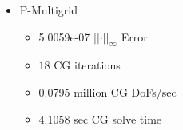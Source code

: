 \documentclass{beamer}
\begin{document}
\begin{frame}
\begin{center}
{\begin{multicols}{2}
\begin{itemize}
\begin{itemize}
\item 13.5436 sec \hfill CG solve time \hspace{1em}

\end{itemize}

\item P-Multigrid

\begin{itemize}

\item 5.0059e-07 \hfill $\lvert \lvert \cdot \rvert \rvert_\infty$ Error \hspace{1em}

\item $18$ \hfill CG iterations \hspace{1em}

\item 0.0795 million \hfill CG DoFs/sec \hspace{1em}

\item 4.1058 sec \hfill CG solve time \hspace{1em}

\end{itemize}

\end{itemize}

\end{multicols}

}

\end{center}
\end{frame}

\end{document}
